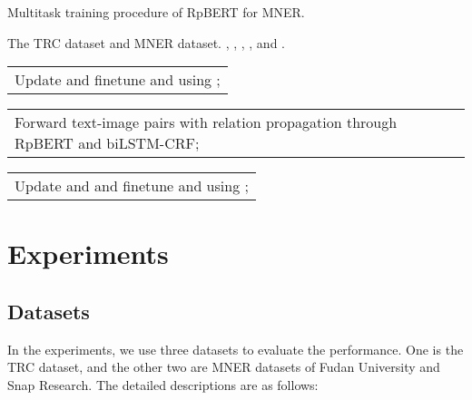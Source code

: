 \documentclass[letterpaper]{article} \usepackage{aaai21}  \usepackage{times}  \usepackage{helvet} \usepackage{courier}  \usepackage[hyphens]{url}  \usepackage{graphicx} \urlstyle{rm} \def\UrlFont{\rm}  \usepackage{natbib}  \usepackage{caption} \frenchspacing  \setlength{\pdfpagewidth}{8.5in}  \setlength{\pdfpageheight}{11in}
\makeatletter
\newcommand{\multiline}[1]{\begin{tabularx}{\dimexpr\linewidth-\ALG@thistlm}[t]{@{}X@{}}
    #1
  \end{tabularx}
}
\makeatother
\begin{document}
\begin{algorithm}[tb]
\caption{Multitask training procedure of RpBERT for MNER.} \label{alg:tasks}
\begin{algorithmic}[1]
\Require The TRC dataset and MNER dataset.
\Ensure  , , , , and .
\State \multiline{Update  and finetune   and  using ;}
\EndFor
{}
\State \multiline{Forward text-image pairs with relation propagation through  RpBERT and biLSTM-CRF;}
\State \multiline{Update  and  and finetune  and  using ;}
\EndFor
\EndFor
\end{algorithmic}
\end{algorithm}

\section{Experiments}
\label{sec:length}

\subsection{Datasets}

In the experiments, we use three datasets to evaluate the performance. One is the TRC dataset, and the other two are  MNER  datasets of Fudan University and Snap Research. 
The detailed descriptions are as follows:
\end{document}
